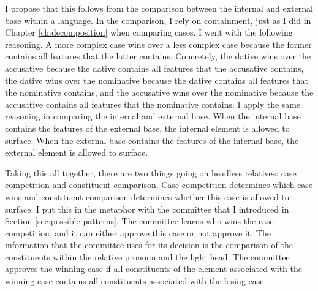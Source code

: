 I propose that this follows from the comparison between the internal and external base within a language.
In the comparison, I rely on containment, just as I did in Chapter \ref{ch:decomposition} when comparing cases. I went with the following reasoning. A more complex case wins over a less complex case because the former contains all features that the latter contains. Concretely, the dative wins over the accusative because the dative contains all features that the accusative contains, the dative wins over the nominative because the dative contains all features that the nominative contains, and the accusative wins over the nominative because the accusative contains all features that the nominative contains.
I apply the same reasoning in comparing the internal and external base. When the internal base contains the features of the external base, the internal element is allowed to surface. When the external base contains the features of the internal base, the external element is allowed to surface.

Taking this all together, there are two things going on headless relatives: case competition and constituent comparison. Case competition determines which case wins and constituent comparison determines whether this case is allowed to surface.
I put this in the metaphor with the committee that I introduced in Section \ref{sec:possible-patterns}. The committee learns who wins the case competition, and it can either approve this case or not approve it. The information that the committee uses for its decision is the comparison of the constituents within the relative pronoun and the light head. The committee approves the winning case if all constituents of the element associated with the winning case contains all constituents associated with the losing case.




